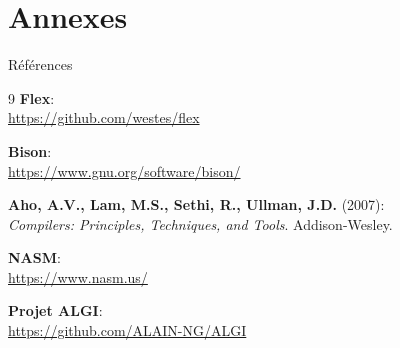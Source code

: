 \documentclass[10pt]{beamer}
\begin{document}
\section*{Annexes}
\begin{frame}[allowframebreaks]{Références}
    \begin{thebibliography}{9}
         \textbf{Flex}: \\
        \url{https://github.com/westes/flex}
        
         \textbf{Bison}: \\
        \url{https://www.gnu.org/software/bison/}
        
         \textbf{Aho, A.V., Lam, M.S., Sethi, R., Ullman, J.D.} (2007): \\
        \textit{Compilers: Principles, Techniques, and Tools}. Addison-Wesley.
        
         \textbf{NASM}: \\
        \url{https://www.nasm.us/}
        
         \textbf{Projet ALGI}: \\
        \url{https://github.com/ALAIN-NG/ALGI}
    \end{thebibliography}
\end{frame}

\end{document}

